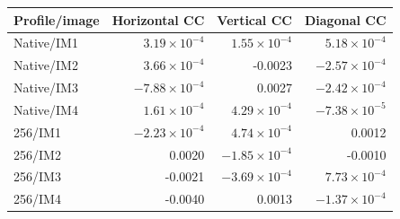 \begin{center}
{\small
\setlength{\tabcolsep}{4pt}
\begin{tabular}{@{}lrrr@{}}
\toprule
Profile/image & Horizontal CC & Vertical CC & Diagonal CC \\
\midrule
Native/IM1 & $3.19\times10^{-4}$ & $1.55\times10^{-4}$ & $5.18\times10^{-4}$ \\
Native/IM2 & $3.66\times10^{-4}$ & -0.0023 & $-2.57\times10^{-4}$ \\
Native/IM3 & $-7.88\times10^{-4}$ & 0.0027 & $-2.42\times10^{-4}$ \\
Native/IM4 & $1.61\times10^{-4}$ & $4.29\times10^{-4}$ & $-7.38\times10^{-5}$ \\
256/IM1 & $-2.23\times10^{-4}$ & $4.74\times10^{-4}$ & 0.0012 \\
256/IM2 & 0.0020 & $-1.85\times10^{-4}$ & -0.0010 \\
256/IM3 & -0.0021 & $-3.69\times10^{-4}$ & $7.73\times10^{-4}$ \\
256/IM4 & -0.0040 & 0.0013 & $-1.37\times10^{-4}$ \\
\bottomrule
\end{tabular}}
\end{center}
